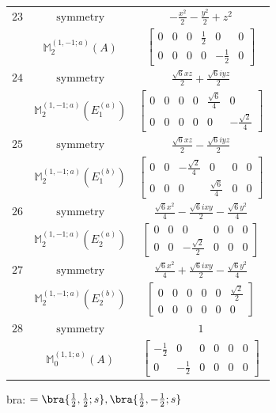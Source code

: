 \documentclass[fleqn,8pt,landscape]{jsarticle}
\begin{document}
\begin{longtable}{ccc}
$ 23 $ & $ \text{symmetry} $ & $ - \frac{x^{2}}{2} - \frac{y^{2}}{2} + z^{2} $ \\
$  $ & $ \mathbb{M}_{2}^{(1,-1;a)}(A) $ & $ \begin{bmatrix} 0 & 0 & 0 & \frac{1}{2} & 0 & 0 \\ 0 & 0 & 0 & 0 & - \frac{1}{2} & 0 \end{bmatrix} $ \\ \hline
$ 24 $ & $ \text{symmetry} $ & $ \frac{\sqrt{6} x z}{2} + \frac{\sqrt{6} i y z}{2} $ \\
$  $ & $ \mathbb{M}_{2}^{(1,-1;a)}(E_{1}^{(a)}) $ & $ \begin{bmatrix} 0 & 0 & 0 & 0 & \frac{\sqrt{6}}{4} & 0 \\ 0 & 0 & 0 & 0 & 0 & - \frac{\sqrt{2}}{4} \end{bmatrix} $ \\ \hline
$ 25 $ & $ \text{symmetry} $ & $ \frac{\sqrt{6} x z}{2} - \frac{\sqrt{6} i y z}{2} $ \\
$  $ & $ \mathbb{M}_{2}^{(1,-1;a)}(E_{1}^{(b)}) $ & $ \begin{bmatrix} 0 & 0 & - \frac{\sqrt{2}}{4} & 0 & 0 & 0 \\ 0 & 0 & 0 & \frac{\sqrt{6}}{4} & 0 & 0 \end{bmatrix} $ \\ \hline
$ 26 $ & $ \text{symmetry} $ & $ \frac{\sqrt{6} x^{2}}{4} - \frac{\sqrt{6} i x y}{2} - \frac{\sqrt{6} y^{2}}{4} $ \\
$  $ & $ \mathbb{M}_{2}^{(1,-1;a)}(E_{2}^{(a)}) $ & $ \begin{bmatrix} 0 & 0 & 0 & 0 & 0 & 0 \\ 0 & 0 & - \frac{\sqrt{2}}{2} & 0 & 0 & 0 \end{bmatrix} $ \\ \hline
$ 27 $ & $ \text{symmetry} $ & $ \frac{\sqrt{6} x^{2}}{4} + \frac{\sqrt{6} i x y}{2} - \frac{\sqrt{6} y^{2}}{4} $ \\
$  $ & $ \mathbb{M}_{2}^{(1,-1;a)}(E_{2}^{(b)}) $ & $ \begin{bmatrix} 0 & 0 & 0 & 0 & 0 & \frac{\sqrt{2}}{2} \\ 0 & 0 & 0 & 0 & 0 & 0 \end{bmatrix} $ \\ \hline
$ 28 $ & $ \text{symmetry} $ & $ 1 $ \\
$  $ & $ \mathbb{M}_{0}^{(1,1;a)}(A) $ & $ \begin{bmatrix} - \frac{1}{2} & 0 & 0 & 0 & 0 & 0 \\ 0 & - \frac{1}{2} & 0 & 0 & 0 & 0 \end{bmatrix} $ \\ \hline
\end{longtable}
bra: $=\bra{\frac{1}{2},\frac{1}{2};s}, \bra{\frac{1}{2},- \frac{1}{2};s}$
\end{document}
